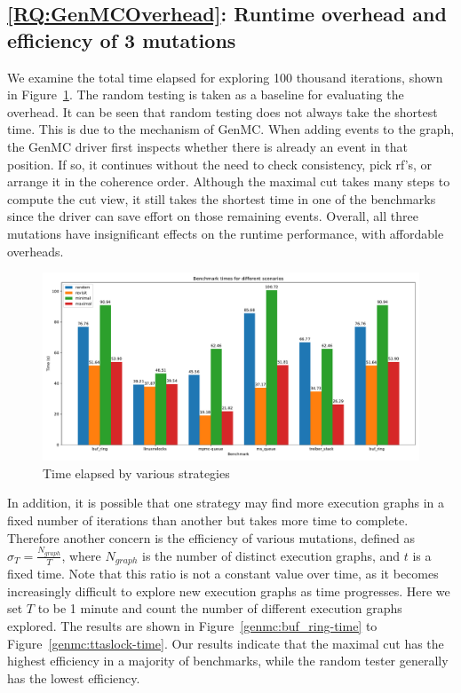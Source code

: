 \subsection{\ref*{RQ:GenMCOverhead}: Runtime overhead and efficiency of 3 mutations }

We examine the total time elapsed for exploring 100 thousand iterations, shown in Figure~\ref{genmc:overhead}. The random testing is taken as a baseline for evaluating the overhead. It can be seen that random testing does not always take the shortest time. This is due to the mechanism of GenMC. When adding events to the graph, the GenMC driver first inspects whether there is already an event in that position. If so, it continues without the need to check consistency, pick rf's, or arrange it in the coherence order. Although the maximal cut takes many steps to compute the cut view, it still takes the shortest time in one of the benchmarks since the driver can save effort on those remaining events. Overall, all three mutations have insignificant effects on the runtime performance, with affordable overheads.




\begin{figure}[h!tbp]
	\centering
	\includegraphics[scale=0.37]{figure/genmc/overhead.pdf}
	\caption{Time elapsed by various strategies}
	\label{genmc:overhead}
\end{figure}

In addition, it is possible that one strategy may find more execution graphs in a fixed number of iterations than another but takes more time to complete. Therefore another concern is the efficiency of various mutations, defined as $\sigma_T = \frac{N_{graph}}{T}$, where $N_{graph}$ is the number of distinct execution graphs, and $t$ is a fixed time. Note that this ratio is not a constant value over time, as it becomes increasingly difficult to explore new execution graphs as time progresses. Here we set $T$ to be 1 minute and count the number of different execution graphs explored. The results are shown in Figure~\ref{genmc:buf_ring-time} to Figure~\ref{genmc:ttaslock-time}. Our results indicate that the maximal cut has the highest efficiency in a majority of benchmarks, while the random tester generally has the lowest efficiency.



